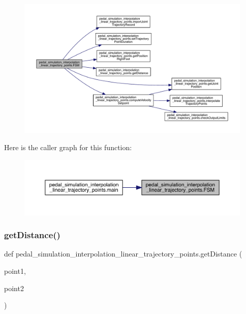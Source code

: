 \begin{figure}[H]
\begin{center}
\leavevmode
\includegraphics[width=350pt]{namespacepedal__simulation__interpolation__linear__trajectory__points_aa9b9e1956f51882e5f93d5f2bc0fd29b_cgraph}
\end{center}
\end{figure}
Here is the caller graph for this function\+:\nopagebreak
\begin{figure}[H]
\begin{center}
\leavevmode
\includegraphics[width=350pt]{namespacepedal__simulation__interpolation__linear__trajectory__points_aa9b9e1956f51882e5f93d5f2bc0fd29b_icgraph}
\end{center}
\end{figure}
\mbox{\label{namespacepedal__simulation__interpolation__linear__trajectory__points_abcf37086aa984f3a2d352f009de5a362}} 
\subsubsection{\texorpdfstring{getDistance()}{getDistance()}}
{\footnotesize\ttfamily def pedal\+\_\+simulation\+\_\+interpolation\+\_\+linear\+\_\+trajectory\+\_\+points.\+get\+Distance (\begin{DoxyParamCaption}\item[{}]{point1,  }\item[{}]{point2 }\end{DoxyParamCaption})}



